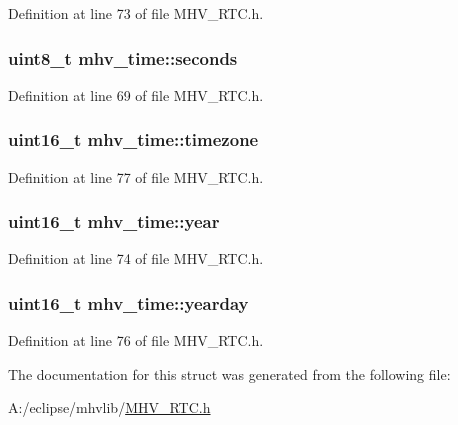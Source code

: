 \-Definition at line 73 of file \-M\-H\-V\-\_\-\-R\-T\-C.\-h.

\hypertarget{structmhv__time_a4844293af0a3648391fb9335f2aa758c}{
\subsubsection[{seconds}]{\setlength{\rightskip}{0pt plus 5cm}uint8\-\_\-t {\bf mhv\-\_\-time\-::seconds}}}
\label{structmhv__time_a4844293af0a3648391fb9335f2aa758c}


\-Definition at line 69 of file \-M\-H\-V\-\_\-\-R\-T\-C.\-h.

\hypertarget{structmhv__time_abe9ad1b2bfd43e6688c07367a279c50b}{
\subsubsection[{timezone}]{\setlength{\rightskip}{0pt plus 5cm}uint16\-\_\-t {\bf mhv\-\_\-time\-::timezone}}}
\label{structmhv__time_abe9ad1b2bfd43e6688c07367a279c50b}


\-Definition at line 77 of file \-M\-H\-V\-\_\-\-R\-T\-C.\-h.

\hypertarget{structmhv__time_ab5441551ca64fde709afdc98fa5c851e}{
\subsubsection[{year}]{\setlength{\rightskip}{0pt plus 5cm}uint16\-\_\-t {\bf mhv\-\_\-time\-::year}}}
\label{structmhv__time_ab5441551ca64fde709afdc98fa5c851e}


\-Definition at line 74 of file \-M\-H\-V\-\_\-\-R\-T\-C.\-h.

\hypertarget{structmhv__time_aa5e9d8969550c007c40f6b2dd404d3d6}{
\subsubsection[{yearday}]{\setlength{\rightskip}{0pt plus 5cm}uint16\-\_\-t {\bf mhv\-\_\-time\-::yearday}}}
\label{structmhv__time_aa5e9d8969550c007c40f6b2dd404d3d6}


\-Definition at line 76 of file \-M\-H\-V\-\_\-\-R\-T\-C.\-h.



\-The documentation for this struct was generated from the following file\-:\begin{DoxyCompactItemize}
\item 
\-A\-:/eclipse/mhvlib/\hyperlink{_m_h_v___r_t_c_8h}{\-M\-H\-V\-\_\-\-R\-T\-C.\-h}\end{DoxyCompactItemize}
